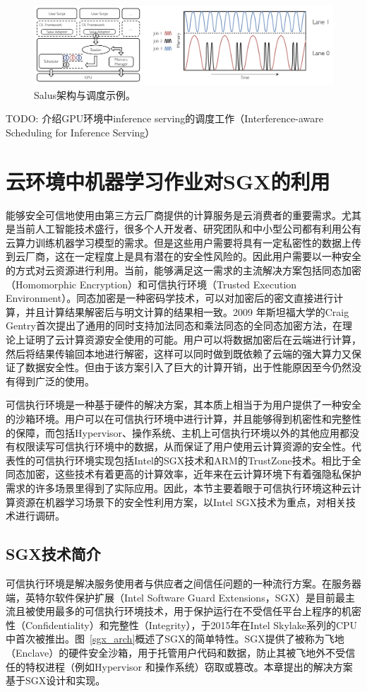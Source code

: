 \begin{figure}[h]
    \centerline{\includegraphics[width=\textwidth]{figures/salus-arch-sche.png}}
    \caption{Salus架构与调度示例。}
    \label{salus_arch_sche}
\end{figure}

TODO: 介绍GPU环境中inference serving的调度工作（Interference-aware Scheduling for Inference Serving）

\section{云环境中机器学习作业对SGX的利用}
能够安全可信地使用由第三方云厂商提供的计算服务是云消费者的重要需求。尤其是当前人工智能技术盛行，很多个人开发者、研究团队和中小型公司都有利用公有云算力训练机器学习模型的需求。但是这些用户需要将具有一定私密性的数据上传到云厂商，这在一定程度上是具有潜在的安全性风险的。因此用户需要以一种安全的方式对云资源进行利用。当前，能够满足这一需求的主流解决方案包括同态加密（Homomorphic Encryption）和可信执行环境（Trusted Execution Environment）。同态加密是一种密码学技术，可以对加密后的密文直接进行计算，并且计算结果解密后与明文计算的结果相一致。2009 年斯坦福大学的Craig Gentry首次提出了通用的同时支持加法同态和乘法同态的全同态加密方法，在理论上证明了云计算资源安全使用的可能。用户可以将数据加密后在云端进行计算，然后将结果传输回本地进行解密，这样可以同时做到既依赖了云端的强大算力又保证了数据安全性。但由于该方案引入了巨大的计算开销，出于性能原因至今仍然没有得到广泛的使用。

可信执行环境是一种基于硬件的解决方案，其本质上相当于为用户提供了一种安全的沙箱环境。用户可以在可信执行环境中进行计算，并且能够得到机密性和完整性的保障，而包括Hypervisor、操作系统、主机上可信执行环境以外的其他应用都没有权限读写可信执行环境中的数据，从而保证了用户使用云计算资源的安全性。代表性的可信执行环境实现包括Intel的SGX技术和ARM的TrustZone技术。相比于全同态加密，这些技术有着更高的计算效率，近年来在云计算环境下有着强隐私保护需求的许多场景里得到了实际应用。因此，本节主要着眼于可信执行环境这种云计算资源在机器学习场景下的安全性利用方案，以Intel SGX技术为重点，对相关技术进行调研。

\subsection{SGX技术简介}
可信执行环境是解决服务使用者与供应者之间信任问题的一种流行方案。在服务器端，英特尔软件保护扩展（Intel Software Guard Extensions，SGX）是目前最主流且被使用最多的可信执行环境技术，用于保护运行在不受信任平台上程序的机密性（Confidentiality）和完整性（Integrity），于2015年在Intel Skylake系列的CPU中首次被推出。图~\ref{sgx_arch}概述了SGX的简单特性。SGX提供了被称为飞地（Enclave）的硬件安全沙箱，用于托管用户代码和数据，防止其被飞地外不受信任的特权进程（例如Hypervisor 和操作系统）窃取或篡改。本章提出的解决方案基于SGX设计和实现。

